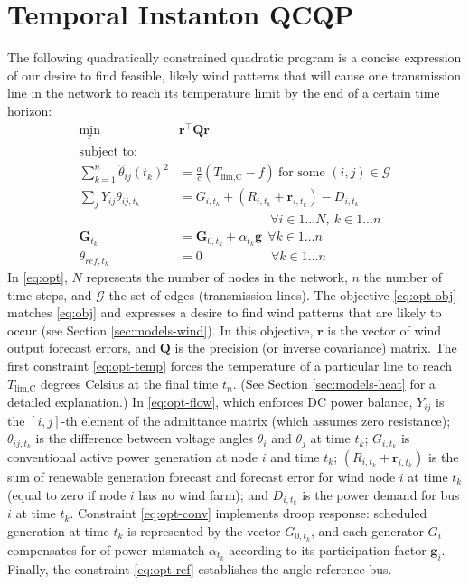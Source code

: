 \documentclass[journal,twoside]{IEEEtran}
\renewcommand{\vec}[1]{\mathbf{#1}}
\begin{document}
\section{Temporal Instanton QCQP}\label{sec:qcqp}
The following quadratically constrained quadratic program is a concise expression of our desire to find feasible, likely wind patterns that will cause one transmission line in the network to reach its temperature limit by the end of a certain time horizon:
\begin{subequations}\label{eq:opt}
\begin{align}
\label{eq:opt-obj}\underset{\vec{r}}{\min} \quad & \vec{r}^\top \mathbf{Q} \vec{r} \\
\nonumber \text{subject to:} & \\
\label{eq:opt-temp} \sum_{k=1}^n \hat{\theta}_{ij}(t_k)^2 &= \frac{a}{c}\left(T_\text{lim,C} - f\right)~ \text{for some }(i,j)\in \mathcal{G} \\
\label{eq:opt-flow} \sum_j Y_{ij} \theta_{ij,t_k} & = G_{i,t_k} + (R_{i,t_k} +
\vec{r}_{i,t_k}) - D_{i,t_k} \\[-6pt]
\nonumber &\qquad\qquad\qquad\quad~ \forall i \in 1... N,~k\in 1... n \\[6pt]
\label{eq:opt-conv} \vec{G}_{t_k} &= \vec{G}_{0,t_k} + \alpha_{t_k}\vec{g} ~~ \forall k\in 1\ldots n \\
\label{eq:opt-ref} \theta_{ref,t_k} & = 0 \quad\quad\quad\quad\quad~~ \forall k\in 1\ldots n
\end{align}
\end{subequations}
In \eqref{eq:opt}, $N$ represents the number of nodes in the network, $n$ the number of time steps, and $\mathcal{G}$ the set of edges (transmission lines). The objective \eqref{eq:opt-obj} matches \eqref{eq:obj} and expresses a desire to find wind patterns that are likely to occur (see Section \ref{sec:models-wind}). In this objective, $\vec{r}$ is the vector of wind output forecast errors, and $\mathbf{Q}$ is the precision (or inverse covariance) matrix. The first constraint \eqref{eq:opt-temp} forces the temperature of a particular line to reach $T_\text{lim,C}$ degrees Celsius at the final time $t_n$. (See Section \ref{sec:models-heat} for a detailed explanation.) In \eqref{eq:opt-flow}, which enforces DC power balance, $Y_{ij}$ is the $[i,j]$-th element of the admittance matrix (which assumes zero resistance); $\theta_{ij,t_k}$ is the difference between voltage angles $\theta_i$ and $\theta_j$ at time $t_k$; $G_{i,t_k}$ is conventional active power generation at node $i$ and time $t_k$; $(R_{i,t_k} + \vec{r}_{i,t_k})$ is the sum of renewable generation forecast and forecast error for wind node $i$ at time $t_k$ (equal to zero if node $i$ has no wind farm); and $D_{i,t_k}$ is the power demand for bus $i$ at time $t_k$. Constraint \eqref{eq:opt-conv} implements droop response: scheduled generation at time $t_k$ is represented by the vector $G_{0,t_k}$, and each generator $G_i$ compensates for of power mismatch $\alpha_{t_k}$ according to its participation factor $\vec{g}_i$. Finally, the constraint \eqref{eq:opt-ref} establishes the angle reference bus.
\end{document}
